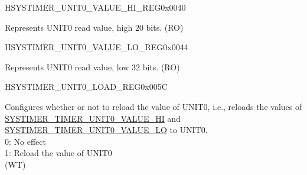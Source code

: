 \begin{register}{H}{SYSTIMER\_UNIT0\_VALUE\_HI\_REG}{0x0040}\label{regdesc:SYSTIMERUNIT0VALUEHIREG}
%
%
\regnewline%
\begin{regdesc}\begin{reglist}
\label{fielddesc:SYSTIMERTIMERUNIT0VALUEHI}\item [SYSTIMER\_TIMER\_UNIT0\_VALUE\_HI] Represents UNIT0 read value, high 20 bits. (RO)
\end{reglist}\end{regdesc}
\end{register}


\begin{register}{H}{SYSTIMER\_UNIT0\_VALUE\_LO\_REG}{0x0044}\label{regdesc:SYSTIMERUNIT0VALUELOREG}
%
\regnewline%
\begin{regdesc}\begin{reglist}
\label{fielddesc:SYSTIMERTIMERUNIT0VALUELO}\item [SYSTIMER\_TIMER\_UNIT0\_VALUE\_LO] Represents UNIT0 read value, low 32 bits. (RO)
\end{reglist}\end{regdesc}
\end{register}


\begin{register}{H}{SYSTIMER\_UNIT0\_LOAD\_REG}{0x005C}\label{regdesc:SYSTIMERUNIT0LOADREG}
%
%
\regnewline%
\begin{regdesc}\begin{reglist}
\label{fielddesc:SYSTIMERTIMERUNIT0LOAD}\item [SYSTIMER\_TIMER\_UNIT0\_LOAD] Configures whether or not to reload the value of UNIT0, i.e., reloads the values of \hyperref[fielddesc:SYSTIMERTIMERUNIT0VALUEHI]{SYSTIMER\_TIMER\_UNIT0\_VALUE\_HI} and \hyperref[fielddesc:SYSTIMERTIMERUNIT0VALUELO]{SYSTIMER\_TIMER\_UNIT0\_VALUE\_LO} to UNIT0. \\
0: No effect \\
1: Reload the value of UNIT0\\
(WT)
\end{reglist}\end{regdesc}
\end{register}


